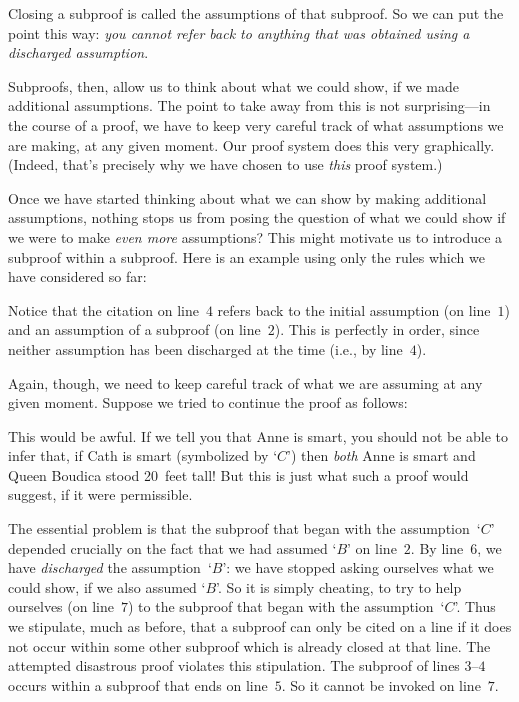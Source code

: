 Closing a subproof is called  the assumptions of
that subproof. So we can put the point this way: \emph{you cannot
refer back to anything that was obtained using a discharged
assumption}.

Subproofs, then, allow us to think about what we could show, if we made additional assumptions. The point to take away from this is not surprising---in the course of a proof, we have to keep very careful track of what assumptions we are making, at any given moment. Our proof system does this very graphically. (Indeed, that's precisely why we have chosen to use \emph{this} proof system.)

Once we have started thinking about what we can show by making additional assumptions, nothing stops us from posing the question of what we could show if we were to make \emph{even more} assumptions? This might motivate us to introduce a subproof within a subproof. Here is an example using only the rules which we have considered so far: 
\begin{fitchproof}
\PR
\open
	\AS
	\open
		\AS
	\close
\close
{}
\end{fitchproof}
Notice that the citation on line~$4$ refers back to the initial
assumption (on line~$1$) and an assumption of a subproof (on
line~$2$). This is perfectly in order, since neither assumption has
been discharged at the time (i.e., by line~$4$).

Again, though, we need to keep careful track of what we are assuming at any given moment. Suppose we tried to continue the proof as follows:
\begin{fitchproof}
\PR
\open
	\AS
	\open
		\AS
	\close
\close
{}
\ifHTMLtarget
\else
	 
\fi
\end{fitchproof}
This would be awful. If we tell you that Anne is smart, you should not
be able to infer that, if Cath is smart (symbolized by `$C$') then
\emph{both} Anne is smart and Queen Boudica stood 20~feet tall! But
this is just what such a proof would suggest, if it were permissible.

The essential problem is that the subproof that began with the assumption~`$C$' depended crucially on the fact that we had assumed `$B$' on line~$2$. By line~$6$, we have \emph{discharged} the assumption~`$B$': we have stopped asking ourselves what we could show, if we also assumed `$B$'. So it is simply cheating, to try to help ourselves (on line~$7$) to the subproof that began with the assumption~`$C$'. Thus we stipulate, much as before, that a subproof can only be cited on a line if it does not occur within some other subproof which is already closed at that line. The attempted disastrous proof violates this stipulation. The subproof of lines $3$--$4$ occurs within a subproof that ends on line~$5$. So it cannot be invoked on line~$7$.

